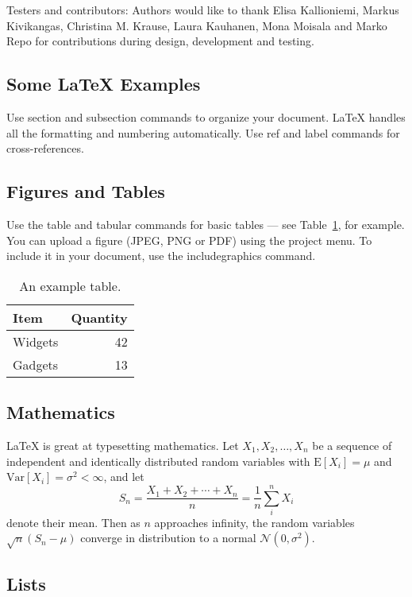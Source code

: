 \documentclass[fleqn,10pt]{wlpeerj}
\begin{document}
Testers and contributors:
Authors would like to thank Elisa Kallioniemi, Markus Kivikangas, Christina M. Krause, Laura Kauhanen, Mona Moisala and Marko Repo for contributions during design, development and testing.


\newpage

\subsection*{Some \LaTeX{} Examples}
\label{sec:examples}

Use section and subsection commands to organize your document. \LaTeX{} handles all the formatting and numbering automatically. Use ref and label commands for cross-references.

\subsection*{Figures and Tables}

Use the table and tabular commands for basic tables --- see Table~\ref{tab:widgets}, for example. You can upload a figure (JPEG, PNG or PDF) using the project menu. To include it in your document, use the includegraphics command.

\begin{table}[ht]
	\centering
	\begin{tabular}{l|r}
		Item & Quantity \\\hline
		Widgets & 42 \\
		Gadgets & 13
	\end{tabular}
	\caption{\label{tab:widgets}An example table.}
\end{table}


\subsection*{Mathematics}

\LaTeX{} is great at typesetting mathematics. Let $X_1, X_2, \ldots, X_n$ be a sequence of independent and identically distributed random variables with $\text{E}[X_i] = \mu$ and $\text{Var}[X_i] = \sigma^2 < \infty$, and let
$$S_n = \frac{X_1 + X_2 + \cdots + X_n}{n}
= \frac{1}{n}\sum_{i}^{n} X_i$$
denote their mean. Then as $n$ approaches infinity, the random variables $\sqrt{n}(S_n - \mu)$ converge in distribution to a normal $\mathcal{N}(0, \sigma^2)$.

\subsection*{Lists}
\end{document}
